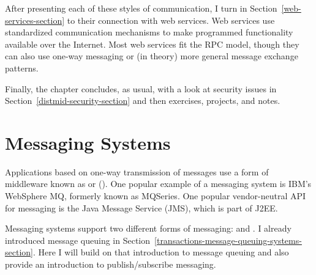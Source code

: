 After presenting each of these styles of communication, I turn in
Section~\ref{web-services-section} to their connection with web
services.  Web services use standardized communication mechanisms to
make programmed functionality available over the Internet.  Most web
services fit the RPC model, though they can also use one-way messaging
or (in theory) more general message exchange patterns.

Finally, the chapter concludes, as usual, with a look at security
issues in Section~\ref{distmid-security-section} and then exercises,
projects, and notes.

\section{Messaging Systems}\label{messaging-section}

Applications based on one-way transmission of messages use a form of
middleware known as  or
 ().  One popular
example of a messaging system is IBM's WebSphere MQ, formerly known as
MQSeries.  One popular vendor-neutral API for messaging is the Java
Message Service (JMS), which is part of J2EE.

Messaging systems support two different forms of messaging:
 and .  I
already introduced message queuing in
Section~\ref{transactions-message-queuing-systems-section}.  Here I
will build on that introduction to message queuing and also
provide an introduction to publish/subscribe messaging.


